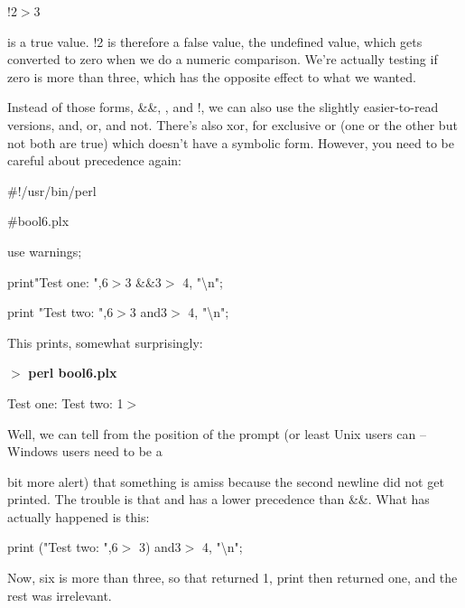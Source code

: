 \documentclass[a4paper,11pt]{book}
\begin{document}
\noindent 

\noindent 

\noindent !2$>$3

\noindent 

 is a true value. !2 is therefore a false value, the undefined value, which gets converted to zero when we do a numeric comparison. We're actually testing if zero is more than three, which has the opposite effect to what we wanted.

\noindent 

\noindent Instead of those forms, \&\&, \textbar \textbar , and !, we can also use the slightly easier-to-read versions, and, or, and not. There's also xor, for exclusive or (one or the other but not both are true) which doesn't have a symbolic form. However, you need to be careful about precedence again:

\noindent 

\noindent 

\noindent \#!/usr/bin/perl

\noindent \#bool6.plx

\noindent use warnings;

\noindent print"Test one: ",6$>$3 \&\&3$>$ 4, "\textbackslash n";

\noindent print "Test two: ",6$>$3 and3$>$ 4, "\textbackslash n";

\noindent 

\noindent This prints, somewhat surprisingly:

\noindent 

\noindent $>$ \textbf{perl bool6.plx}

\noindent Test one: Test two: 1$>$

\noindent 

\noindent Well, we can tell from the position of the prompt (or least Unix users can -- Windows users need to be a

\noindent bit more alert) that something is amiss because the second newline did not get printed. The trouble is that and has a lower precedence than \&\&. What has actually happened is this:

\noindent 

\noindent print ("Test two: ",6$>$ 3) and3$>$ 4, "\textbackslash n";

\noindent 

\noindent 

\noindent Now, six is more than three, so that returned 1, print then returned one, and the rest was irrelevant.
\end{document}
